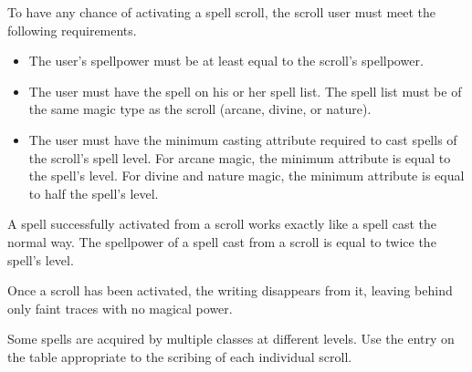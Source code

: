         To have any chance of activating a spell scroll, the scroll user must meet the following requirements.
        \begin{itemize}
            \item The user's spellpower must be at least equal to the scroll's spellpower.
            \item The user must have the spell on his or her spell list.
                The spell list must be of the same magic type as the scroll (arcane, divine, or nature).
            \item The user must have the minimum casting attribute required to cast spells of the scroll's spell level.
                For arcane magic, the minimum attribute is equal to the spell's level.
                For divine and nature magic, the minimum attribute is equal to half the spell's level.
        \end{itemize}

         A spell successfully activated from a scroll works exactly like a spell cast the normal way.
        The spellpower of a spell cast from a scroll is equal to twice the spell's level.

        Once a scroll has been activated, the writing disappears from it, leaving behind only faint traces with no magical power.

         Some spells are acquired by multiple classes at different levels.
        Use the entry on the table appropriate to the scribing of each individual scroll.

